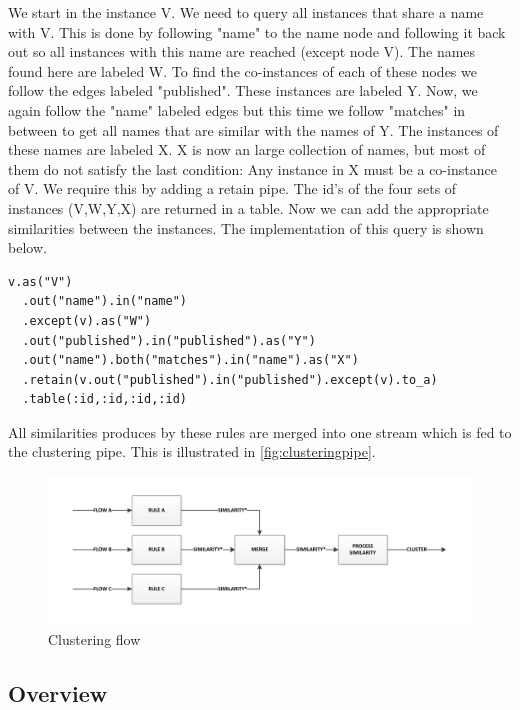 We start in the instance V. We need to query all instances that share a name with V. This is done by following "name" to the name node and following it back out so all instances with this name are reached (except node V). The names found here are labeled W. To find the co-instances of each of these nodes we follow the edges labeled "published". These instances are labeled Y. Now, we again follow the "name" labeled edges but this time we follow "matches" in between to get all names that are similar with the names of Y. The instances of these names are labeled X. X is now an large collection of names, but most of them do not satisfy the last condition: Any instance in X must be a co-instance of V. We require this by adding a retain pipe. The id's of the four sets of instances (V,W,Y,X) are returned in a table. Now we can add the appropriate similarities between the instances. The implementation of this query is shown below.

\begin{verbatim}
v.as("V")
  .out("name").in("name")
  .except(v).as("W")
  .out("published").in("published").as("Y")
  .out("name").both("matches").in("name").as("X")
  .retain(v.out("published").in("published").except(v).to_a)
  .table(:id,:id,:id,:id)
\end{verbatim}

All similarities produces by these rules are merged into one stream which is fed to the clustering pipe. This is illustrated in \autoref{fig:clusteringpipe}.

\begin{figure}[htb]
	\centering
		\includegraphics[width=1\textwidth]{fig/clusteringpipe}
	\caption{Clustering flow}
	\label{fig:clusteringpipe}
\end{figure}

\subsection{Overview}




